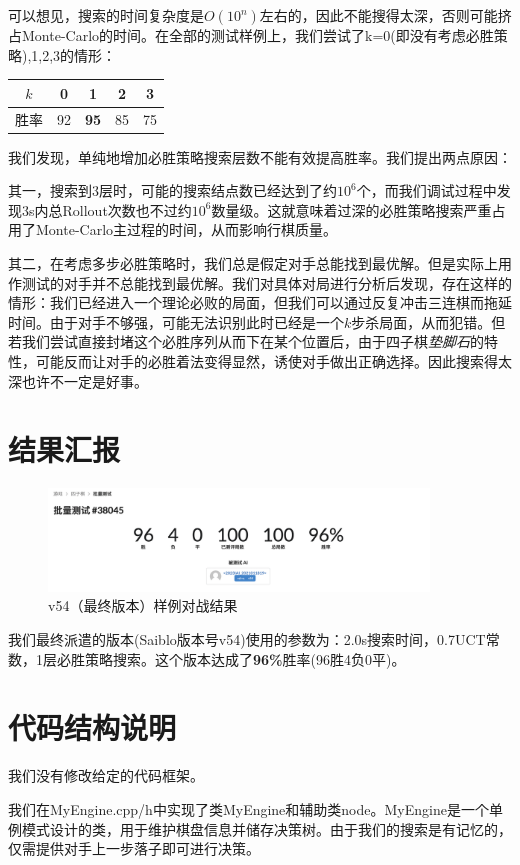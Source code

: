 \documentclass{article}
\begin{document}
	可以想见，搜索的时间复杂度是$O(10^n)$左右的，因此不能搜得太深，否则可能挤占Monte-Carlo的时间。在全部的测试样例上，我们尝试了k=0(即没有考虑必胜策略),1,2,3的情形：
	
	\begin{table}[h]
		\centering
		\begin{tabular}{||c|c|c|c|c||}
			\hline $k$&0&1&2&3 \\
			\hline 胜率&92&\textbf{95}&85&75\\
			\hline
		\end{tabular}
	\end{table}

	我们发现，单纯地增加必胜策略搜索层数不能有效提高胜率。我们提出两点原因：
	
	其一，搜索到3层时，可能的搜索结点数已经达到了约$10^6$个，而我们调试过程中发现3s内总Rollout次数也不过约$10^6$数量级。这就意味着过深的必胜策略搜索严重占用了Monte-Carlo主过程的时间，从而影响行棋质量。
	
	其二，在考虑多步必胜策略时，我们总是假定对手总能找到最优解。但是实际上用作测试的对手并不总能找到最优解。我们对具体对局进行分析后发现，存在这样的情形：我们已经进入一个理论必败的局面，但我们可以通过反复冲击三连棋而拖延时间。由于对手不够强，可能无法识别此时已经是一个$k$步杀局面，从而犯错。但若我们尝试直接封堵这个必胜序列从而下在某个位置后，由于四子棋\textit{垫脚石}的特性，可能反而让对手的必胜着法变得显然，诱使对手做出正确选择。因此搜索得太深也许不一定是好事。
	
	\section{结果汇报}
	
	\begin{figure}[ht]
		\centering
		\includegraphics[width=0.9\textwidth]{v54result}
		\caption{v54（最终版本）样例对战结果}
	\end{figure}
	
	我们最终派遣的版本(Saiblo版本号v54)使用的参数为：2.0s搜索时间，0.7UCT常数，1层必胜策略搜索。这个版本达成了\textbf{96\%}胜率(96胜4负0平)。
	
	\section{代码结构说明}
	
	我们没有修改给定的代码框架。
	
	我们在MyEngine.cpp/h中实现了类MyEngine和辅助类node。MyEngine是一个单例模式设计的类，用于维护棋盘信息并储存决策树。由于我们的搜索是有记忆的，仅需提供对手上一步落子即可进行决策。
\end{document}
